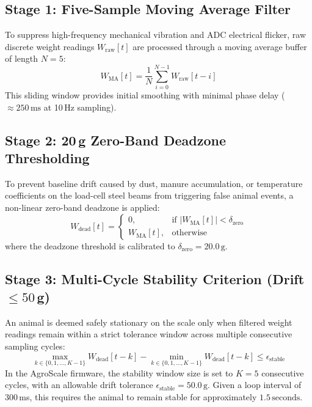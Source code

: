 \documentclass[11pt,a4paper]{report}
\begin{document}
\subsection{Stage 1: Five-Sample Moving Average Filter}
To suppress high-frequency mechanical vibration and ADC electrical flicker, raw discrete weight readings $W_{\text{raw}}[t]$ are processed through a moving average buffer of length $N = 5$:
\begin{equation}
    W_{\text{MA}}[t] = \frac{1}{N} \sum_{i=0}^{N-1} W_{\text{raw}}[t-i]
\end{equation}
This sliding window provides initial smoothing with minimal phase delay ($\approx 250\,\text{ms}$ at 10\,Hz sampling).

\subsection{Stage 2: 20\,g Zero-Band Deadzone Thresholding}
To prevent baseline drift caused by dust, manure accumulation, or temperature coefficients on the load-cell steel beams from triggering false animal events, a non-linear zero-band deadzone is applied:
\begin{equation}
    W_{\text{dead}}[t] = 
    \begin{cases} 
        0, & \text{if } |W_{\text{MA}}[t]| < \delta_{\text{zero}} \\ 
        W_{\text{MA}}[t], & \text{otherwise}
    \end{cases}
\end{equation}
where the deadzone threshold is calibrated to $\delta_{\text{zero}} = 20.0\,\text{g}$.

\subsection{\texorpdfstring{Stage 3: Multi-Cycle Stability Criterion (Drift $\le 50$\,g)}{Stage 3: Multi-Cycle Stability Criterion (Drift <= 50g)}}
An animal is deemed safely stationary on the scale only when filtered weight readings remain within a strict tolerance window across multiple consecutive sampling cycles:
\begin{equation}
    \max_{k \in \{0, 1, \dots, K-1\}} W_{\text{dead}}[t-k] - \min_{k \in \{0, 1, \dots, K-1\}} W_{\text{dead}}[t-k] \le \epsilon_{\text{stable}}
\end{equation}
In the AgroScale firmware, the stability window size is set to $K = 5$ consecutive cycles, with an allowable drift tolerance $\epsilon_{\text{stable}} = 50.0\,\text{g}$. Given a loop interval of 300\,ms, this requires the animal to remain stable for approximately $1.5\,\text{seconds}$. 
\end{document}
